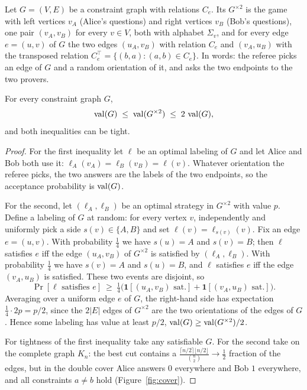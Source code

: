 \begin{definition}\label{def:cover}
Let $G=(V,E)$ be a constraint graph with relations $C_e$.  Its  $G^{\times2}$ is the game with left
vertices $v_A$ (Alice's questions) and right vertices $v_B$ (Bob's questions), one pair $(v_A,v_B)$ for
every $v\in V$, both with alphabet $\Sigma_v$, and for every edge $e=(u,v)$ of $G$ the two edges
$(u_A,v_B)$ with relation $C_e$ and $(v_A,u_B)$ with the transposed relation $C_e^{\top}=\{(b,a):(a,b)\in C_e\}$.
In words: the referee picks an edge of $G$ and a random orientation of it, and asks the two endpoints to the two provers.
\end{definition}

\begin{proposition}\label{prop:cover}
For every constraint graph $G$,
\[
  \operatorname{val}(G)\;\le\;\operatorname{val}(G^{\times2})\;\le\;2\,\operatorname{val}(G),
\]
and both inequalities can be tight.
\end{proposition}
\begin{proof}
For the first inequality let $\ell$ be an optimal labeling of $G$ and let Alice and Bob both use it:
$\ell_A(v_A)=\ell_B(v_B)=\ell(v)$.  Whatever orientation the referee picks, the two answers are the labels of the two endpoints, so
the acceptance probability is $\operatorname{val}(G)$.

For the second, let $(\ell_A,\ell_B)$ be an optimal strategy in $G^{\times2}$ with value $p$.  Define a labeling of
$G$ at random: for every vertex $v$, independently and uniformly pick a side $s(v)\in\{A,B\}$ and set
$\ell(v)=\ell_{s(v)}(v)$.  Fix an edge $e=(u,v)$.  With probability $\tfrac14$ we have $s(u)=A$ and $s(v)=B$;
then $\ell$ satisfies $e$ iff the edge $(u_A,v_B)$ of $G^{\times2}$ is satisfied by $(\ell_A,\ell_B)$.  With probability
$\tfrac14$ we have $s(v)=A$ and $s(u)=B$, and $\ell$ satisfies $e$ iff the edge $(v_A,u_B)$ is satisfied.  These two events are
disjoint, so
\[
  \Pr[\ell\text{ satisfies }e]\ \ge\ \tfrac14\bigl(\mathbf 1[(u_A,v_B)\text{ sat.}]+\mathbf 1[(v_A,u_B)\text{ sat.}]\bigr).
\]
Averaging over a uniform edge $e$ of $G$, the right-hand side has expectation $\tfrac14\cdot2p=p/2$, since the $2|E|$ edges of
$G^{\times2}$ are the two orientations of the edges of $G$.  Hence some labeling has value at least $p/2$, \ie
$\operatorname{val}(G)\ge\operatorname{val}(G^{\times2})/2$.

For tightness of the first inequality take any satisfiable $G$.  For the second take  on the complete graph $K_n$:
the best cut contains a $\tfrac{\lceil n/2\rceil\lfloor n/2\rfloor}{\binom n2}\to\tfrac12$ fraction of the edges, but in the double
cover Alice answers $0$ everywhere and Bob $1$ everywhere, and all constraints $a\ne b$ hold (Figure~\ref{fig:cover}).
\end{proof}


